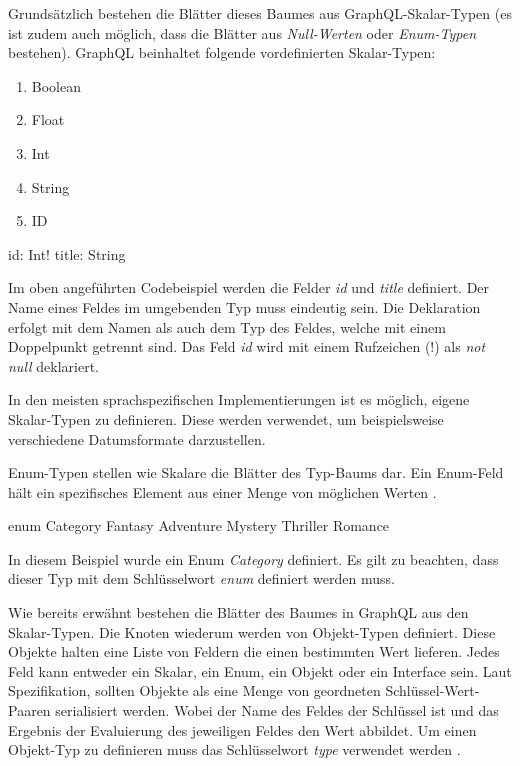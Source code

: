 Grundsätzlich bestehen die Blätter dieses Baumes aus GraphQL-Skalar-Typen (es ist zudem auch möglich, dass die Blätter aus \textit{Null-Werten} oder \textit{Enum-Typen} bestehen).
\cite[Abs. ScalarTypeDefinition]{graphqlOnline}
GraphQL beinhaltet folgende vordefinierten Skalar-Typen:
\begin{enumerate}
    \item Boolean
    \item Float
    \item Int
    \item String
    \item ID
\end{enumerate}

\begin{JsCode}
    id: Int!
    title: String
\end{JsCode}

Im oben angeführten Codebeispiel werden die Felder \textit{id} und \textit{title} definiert.
Der Name eines Feldes im umgebenden Typ muss eindeutig sein.
Die Deklaration erfolgt mit dem Namen als auch dem Typ des Feldes, welche mit einem Doppelpunkt getrennt sind.
Das Feld \textit{id} wird mit einem Rufzeichen (!) als \textit{not null} deklariert.

In den meisten sprachspezifischen Implementierungen ist es möglich, eigene Skalar-Typen zu definieren. Diese werden verwendet, um beispielsweise verschiedene Datumsformate darzustellen.


Enum-Typen stellen wie Skalare die Blätter des Typ-Baums dar.
Ein Enum-Feld hält ein spezifisches Element aus einer Menge von möglichen Werten
\cite[Abs. 3.9]{graphqlOnline}
\cite[S. 60-61]{kress2020graphql}.

\begin{JsCode}
enum Category {
    Fantasy
    Adventure
    Mystery
    Thriller
    Romance
}
\end{JsCode}

In diesem Beispiel wurde ein Enum \textit{Category} definiert.
Es gilt zu beachten, dass dieser Typ mit dem Schlüsselwort \textit{enum} definiert werden muss.

Wie bereits erwähnt bestehen die Blätter des Baumes in GraphQL aus den Skalar-Typen.
Die Knoten wiederum werden von Objekt-Typen definiert.
Diese Objekte halten eine Liste von Feldern die einen bestimmten Wert lieferen.
Jedes Feld kann entweder ein Skalar, ein Enum, ein Objekt oder ein Interface sein.
Laut Spezifikation, sollten Objekte als eine Menge von geordneten Schlüssel-Wert-Paaren serialisiert werden.
Wobei der Name des Feldes der Schlüssel ist und das Ergebnis der Evaluierung des jeweiligen Feldes den Wert abbildet.
Um einen Objekt-Typ zu definieren muss das Schlüsselwort \textit{type} verwendet werden
\cite[Abs. 3.6]{graphqlOnline}.

